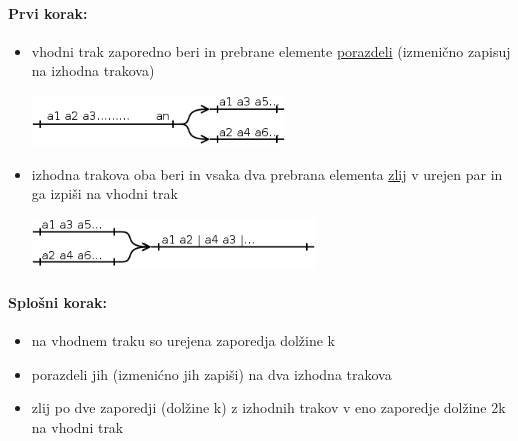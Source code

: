 \documentclass[a4paper,10pt]{article}
\begin{document}
\paragraph{Prvi korak:}
\begin{itemize}
	\item vhodni trak zaporedno beri in prebrane elemente \underline{porazdeli} (izmeni\v cno zapisuj na izhodna trakova) \\
	
	\begin{center}
	\includegraphics[width=6.7cm,height=1.35cm]{Slike/NavadnoZlivanje1.png}
	\end{center}

	\item izhodna trakova oba beri in vsaka dva prebrana elementa \underline{zlij} v urejen par in ga izpi\v si na vhodni trak \\
	
	\begin{center}
	\includegraphics[width=7.5cm,height=1.35cm]{Slike/NavadnoZlivanje2.png}
	\end{center}

\end{itemize}

\paragraph{Splo\v sni korak:}
\begin{itemize}
\item na vhodnem traku so urejena zaporedja dol\v zine k
\item porazdeli jih (izmenićno jih zapi\v si) na dva izhodna trakova
\item zlij po dve zaporedji (dol\v zine k) z izhodnih trakov v eno zaporedje dol\v zine 2k na vhodni trak
\end{itemize}
\end{document}
